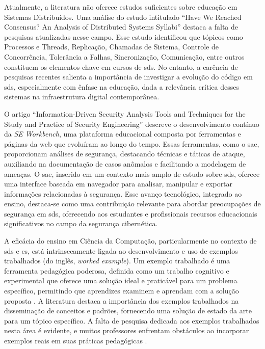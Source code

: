 Atualmente, a literatura não oferece estudos suficientes sobre educação em Sistemas Distribuídos. Uma análise do estudo intitulado ``Have We Reached Consensus? An Analysis of Distributed Systems Syllabi'' \cite{HaveWeReachedConsensus} destaca a falta de pesquisas atualizadas nesse campo. Esse estudo identificou que tópicos como Processos e Threads, Replicação, Chamadas de Sistema, Controle de Concorrência, Tolerância a Falhas, Sincronização, Comunicação, entre outros constituem os elementos-chave em cursos de \gls{sds}. No entanto, a carência de pesquisas recentes salienta a importância de investigar a evolução do código em \gls{sds}, especialmente com ênfase na educação, dada a relevância crítica desses sistemas na infraestrutura digital contemporânea.

O artigo ``Information-Driven Security Analysis Tools and Techniques for the Study and Practice of Security Engineering'' \cite{InformationDrivenSecurityAnalysis} descreve o desenvolvimento contínuo da \textit{SE Workbench}, uma plataforma educacional composta por ferramentas e páginas da web que evoluíram ao longo do tempo. Essas ferramentas, como o \gls{sae}, proporcionam análises de segurança, destacando técnicas e táticas de ataque, auxiliando na documentação de casos anômalos e facilitando a modelagem de ameaças. O \gls{sae}, inserido em um contexto mais amplo de estudo sobre \gls{sds}, oferece uma interface baseada em navegador para analisar, manipular e exportar informações relacionadas à segurança. Esse avanço tecnológico, integrado ao ensino, destaca-se como uma contribuição relevante para abordar preocupações de segurança em \gls{sds}, oferecendo aos estudantes e profissionais recursos educacionais significativos no campo da segurança cibernética.
\cite{SecurityAnalysis:2023}

A eficácia do ensino em Ciência da Computação, particularmente no contexto de \gls{sds} e \gls{es}, está intrinsecamente ligada ao desenvolvimento e uso de exemplos trabalhados (do inglês, \textit{worked example}). Um exemplo trabalhado é uma ferramenta pedagógica poderosa, definida como um trabalho cognitivo e experimental que oferece uma solução ideal e praticável para um problema específico, permitindo que aprendizes examinem e aprendam com a solução proposta \cite{Robert.Atkinson-etal:2000}. A literatura destaca a importância dos exemplos trabalhados na disseminação de conceitos e padrões, fornecendo uma solução de estado da arte para um tópico específico. A falta de pesquisa dedicada aos exemplos trabalhados nesta área é evidente, e muitos professores enfrentam obstáculos ao incorporar exemplos reais em suas práticas pedagógicas \cite{Simone.Tonhao-etal:2021}.

